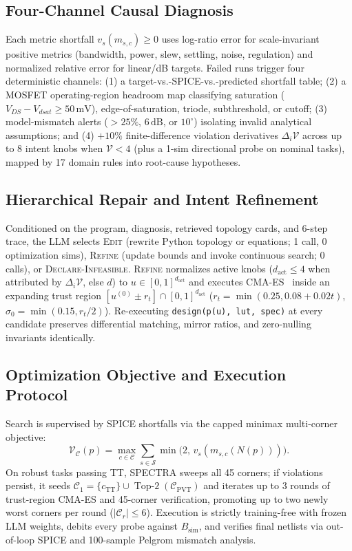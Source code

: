 \documentclass[sigconf,review,anonymous]{acmart}
\begin{document}
\subsection{Four-Channel Causal Diagnosis}
Each metric shortfall $v_s(m_{s,c}) \ge 0$ uses log-ratio error for scale-invariant positive metrics (bandwidth, power, slew, settling, noise, regulation) and normalized relative error for linear/dB targets. Failed runs trigger four deterministic channels: (1) a target-vs.-SPICE-vs.-predicted shortfall table; (2) a MOSFET operating-region headroom map classifying saturation ($V_{DS}-V_{dsat} \ge 50\,\mathrm{mV}$), edge-of-saturation, triode, subthreshold, or cutoff; (3) model-mismatch alerts ($>25\%$, $6\,\mathrm{dB}$, or $10^\circ$) isolating invalid analytical assumptions; and (4) $+10\%$ finite-difference violation derivatives $\Delta_i \mathcal{V}$ across up to 8 intent knobs when $\mathcal{V} < 4$ (plus a 1-sim directional probe on nominal tasks), mapped by 17 domain rules into root-cause hypotheses.

\subsection{Hierarchical Repair and Intent Refinement}
Conditioned on the program, diagnosis, retrieved topology cards, and 6-step trace, the LLM selects \textsc{Edit} (rewrite Python topology or equations; 1 call, 0 optimization sims), \textsc{Refine} (update bounds and invoke continuous search; 0 calls), or \textsc{Declare-Infeasible}. \textsc{Refine} normalizes active knobs ($d_{\text{act}} \le 4$ when attributed by $\Delta_i \mathcal{V}$, else $d$) to $u \in [0,1]^{d_{\text{act}}}$ and executes CMA-ES~\cite{hansen2016cma} inside an expanding trust region $[u^{(0)} \pm r_t] \cap [0,1]^{d_{\text{act}}}$ ($r_t = \min(0.25, 0.08 + 0.02t)$, $\sigma_0 = \min(0.15, r_t/2)$). Re-executing \texttt{design(p(u), lut, spec)} at every candidate preserves differential matching, mirror ratios, and zero-nulling invariants identically.

\subsection{Optimization Objective and Execution Protocol}
Search is supervised by SPICE shortfalls via the capped minimax multi-corner objective:
\begin{equation}
  \mathcal{V}_{\mathcal{C}}(p) = \max_{c \in \mathcal{C}} \sum_{s \in \mathcal{S}} \min\!\big(2,\, v_s(m_{s,c}(N(p)))\big).
  \label{eq:dac_viol}
\end{equation}
On robust tasks passing TT, \textsc{SPECTRA} sweeps all 45 corners; if violations persist, it seeds $\mathcal{C}_1 = \{c_{\text{TT}}\} \cup \operatorname{Top-2}(\mathcal{C}_{\text{PVT}})$ and iterates up to 3 rounds of trust-region CMA-ES and 45-corner verification, promoting up to two newly worst corners per round ($|\mathcal{C}_r| \le 6$). Execution is strictly training-free with frozen LLM weights, debits every probe against $B_{\text{sim}}$, and verifies final netlists via out-of-loop SPICE and 100-sample Pelgrom mismatch analysis.
\end{document}
